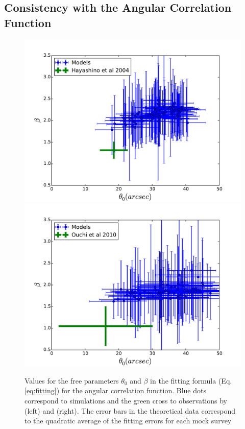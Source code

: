 \documentclass[usenatbib]{mn2e}
\begin{document}
\subsection{Consistency with the Angular Correlation Function}



\begin{figure}
\begin{center}
\includegraphics[width=0.46\linewidth,angle=0]{power_law_correlation_maxden.pdf} 
\hspace{5mm}  
\includegraphics[width=0.46\linewidth,angle=0]{power_law_correlation_meanden.pdf} 
\end{center}
\caption{Values for the free parameters $\theta_{0}$ and $\beta$
in the fitting formula (Eq. \ref{eq:fitting}) for the angular
correlation function. Blue dots correspond to simulations and the
green cross to observations by \citet{Hayashino2004} (left) and
\citet{Ouchi2010} (right). The error bars in the theoretical data correspond
to the quadratic average of the fitting errors for each mock survey
\label{fig:correlation_parameters}}
\end{figure} 
\end{document}
